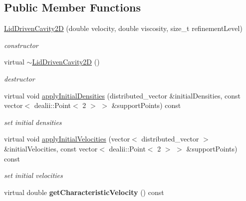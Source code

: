 \subsection*{Public Member Functions}
\begin{DoxyCompactItemize}
\item 
\hyperlink{classnatrium_1_1LidDrivenCavity2D_a139fe700f3e871e1b51eada1a41c69b1}{LidDrivenCavity2D} (double velocity, double viscosity, size\_\-t refinementLevel)
\begin{DoxyCompactList}\small\item\em constructor \item\end{DoxyCompactList}\item 
\hypertarget{classnatrium_1_1LidDrivenCavity2D_a8ae5029b008eb3d3c810bae81440b29c}{
virtual \hyperlink{classnatrium_1_1LidDrivenCavity2D_a8ae5029b008eb3d3c810bae81440b29c}{$\sim$LidDrivenCavity2D} ()}
\label{classnatrium_1_1LidDrivenCavity2D_a8ae5029b008eb3d3c810bae81440b29c}

\begin{DoxyCompactList}\small\item\em destructor \item\end{DoxyCompactList}\item 
virtual void \hyperlink{classnatrium_1_1LidDrivenCavity2D_ab4a8629cfd3472847d40cf42a4ca72a8}{applyInitialDensities} (distributed\_\-vector \&initialDensities, const vector$<$ dealii::Point$<$ 2 $>$ $>$ \&supportPoints) const 
\begin{DoxyCompactList}\small\item\em set initial densities \item\end{DoxyCompactList}\item 
virtual void \hyperlink{classnatrium_1_1LidDrivenCavity2D_a6e633e30cfeae500757bdd4c37a5c478}{applyInitialVelocities} (vector$<$ distributed\_\-vector $>$ \&initialVelocities, const vector$<$ dealii::Point$<$ 2 $>$ $>$ \&supportPoints) const 
\begin{DoxyCompactList}\small\item\em set initial velocities \item\end{DoxyCompactList}\item 
\hypertarget{classnatrium_1_1LidDrivenCavity2D_a82c2d453cd5dd83f09a438201a7adec6}{
virtual double {\bfseries getCharacteristicVelocity} () const }
\label{classnatrium_1_1LidDrivenCavity2D_a82c2d453cd5dd83f09a438201a7adec6}

\end{DoxyCompactItemize}


